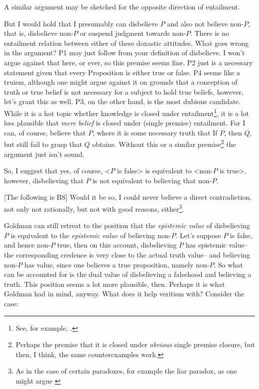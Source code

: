 \documentclass[12pt,numbers=noenddot]{scrartcl}
\begin{document}
A similar argument may be sketched for the opposite direction of entailment.

But I would hold that I presumably can disbelieve $P$ and also not believe non-$P$, that is, disbelieve non-$P$ or suspend judgment towards non-$P$. There is no entailment relation between either of these doxastic attitudes. What goes wrong in the argument? P1 may just follow from your definition of disbelieve. I won't argue against that here, or ever, so this premise seems fine. P2 just is a necessary statement given that every Proposition is either true or false. P4 seems like a truism, although one might argue against it on grounds that a conception of truth or true belief is not necessary for a subject to hold true beliefs, however, let's grant this as well. P3, on the other hand, is the most dubious candidate. While it is a hot topic whether knowledge is closed under entailment\footnote{See, for example, \textcite{Dretske2005-DREIKC}.}, it is a lot less plausible that \emph{mere belief} is closed under (single premise) entailment. For I can, of course, believe that $P$, where it is some necessary truth that If $P$, then $Q$, but still fail to grasp that $Q$ obtains. Without this or a similar premise\footnote{Perhaps the premise that it is closed under \emph{obvious} single premise closure, but then, I think, the same counterexamples work.} the argument just isn't sound.

So, I suggest that yes, of course, <$P$ is false> is equivalent to <non-$P$ is true>, however, disbelieving that $P$ is not equivalent to believing that non-$P$.

[The following is BS]
Would it be so, I could never believe a direct contradiction, not only not rationally, but not with good reasons, either\footnote{As in the case of certain paradoxes, for example the liar paradox, as one might argue \textcite[415]{Priest1998-PRIWIS}}.

Goldman can still retreat to the position that the \emph{epistemic value} of disbelieving $P$ is equivalent to the \emph{epistemic value} of believing non-$P$. Let's suppose $P$ is false, and hence non-$P$ true, then on this account, disbelieving $P$ has epistemic value–the corresponding credence is very close to the actual truth value– and believing non-$P$ has value, since one believes a true proposition, namely non-$P$. So what can be accounted for is the dual value of disbelieving a falsehood and believing a truth. This position seems a lot more plausible, then. Perhaps it is what Goldman had in mind, anyway. What does it help veritism with? Consider the case:
\end{document}
